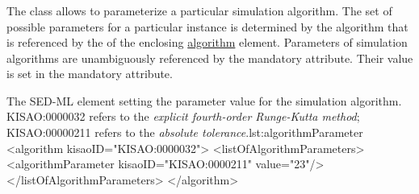  \subsubsection{}
\label{class:algorithmParameter}

The  class allows to parameterize a particular simulation algorithm. The set of possible parameters for a particular instance is determined by the algorithm that is referenced by the  of the enclosing \hyperref[class:algorithm]{algorithm} element. Parameters of simulation algorithms are unambiguously referenced by the mandatory  attribute. Their value is set in the mandatory  attribute.

\begin{myXmlLst}{The SED-ML  element setting the parameter value for the simulation algorithm. KISAO:0000032 refers to the \emph{explicit fourth-order Runge-Kutta method}; KISAO:00000211 refers to the \emph{absolute tolerance}.}{lst:algorithmParameter}
<algorithm kisaoID="KISAO:0000032"> 
  <listOfAlgorithmParameters> 
    <algorithmParameter kisaoID="KISAO:0000211" value="23"/> 
  </listOfAlgorithmParameters> 
</algorithm>
\end{myXmlLst}

